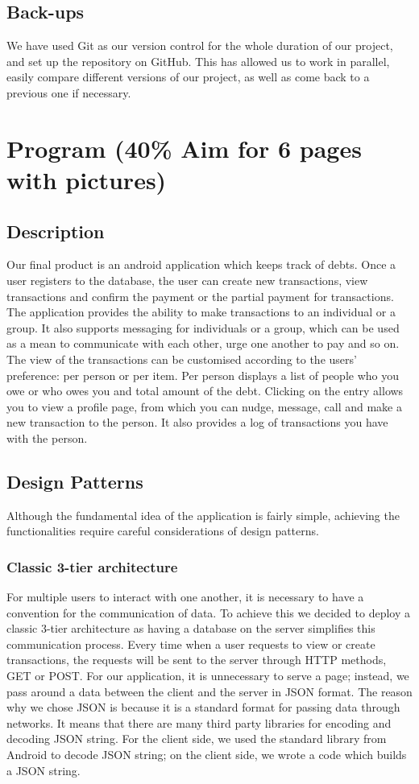 \documentclass[a4paper,11pt]{article}
\begin{document}
\subsection{Back-ups}
We have used Git as our version control for the whole duration of our project, and set up the repository on GitHub. This has allowed us to work in parallel, easily compare different versions of our project, as well as come back to a previous one if necessary.


\section*{Program (40\% Aim for 6 pages with pictures)}
\subsection*{Description}
Our final product is an android application which keeps track of debts. Once a user registers to the database, the user can create new transactions, view transactions and confirm the payment or the partial payment for transactions. The application provides the ability to make transactions to an individual or a group. It also supports messaging for individuals or a group, which can be used as a mean to communicate with each other, urge one another to pay and so on. The view of the transactions can be customised according to the users’ preference: per person or per item. Per person displays a list of people who you owe or who owes you and total amount of the debt. Clicking on the entry allows you to view a profile page, from which you can nudge, message, call and make a new transaction to the person. It also provides a log of transactions you have with the person.

\subsection*{Design Patterns}
Although the fundamental idea of the application is fairly simple, achieving the functionalities require careful considerations of design patterns. 

\subsubsection*{Classic 3-tier architecture}
For multiple users to interact with one another, it is necessary to have a convention for the communication of data. To achieve this we decided to deploy a classic 3-tier architecture as having a database on the server simplifies this communication process. Every time when a user requests to view or create transactions, the requests will be sent to the server through HTTP methods, GET or POST. For our application, it is unnecessary to serve a page; instead, we pass around a data between the client and the server in JSON format. The reason why we chose JSON is because it is a standard format for passing data through networks. It means that there are many third party libraries for encoding and decoding JSON string. For the client side, we used the standard library from Android to decode JSON string; on the client side, we wrote a code which builds a JSON string. 
\end{document}
